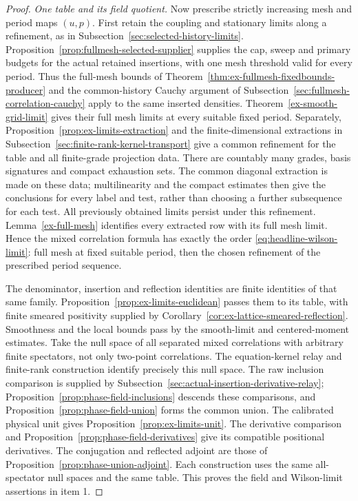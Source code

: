 \begin{proof}
\emph{One table and its field quotient.}
Now prescribe strictly increasing mesh and period maps $(u,p)$.
First retain the coupling and stationary limits along a refinement,
as in Subsection~\ref{sec:selected-history-limits}. Proposition~\ref{prop:fullmesh-selected-supplier} supplies the cap,
sweep and primary budgets for the actual retained insertions, with one
mesh threshold valid for every period. Thus the full-mesh bounds of
Theorem~\ref{thm:ex-fullmesh-fixedbounds-producer} and the common-history
Cauchy argument of Subsection~\ref{sec:fullmesh-correlation-cauchy}
apply to the same inserted densities. Theorem~\ref{ex-smooth-grid-limit}
gives their full mesh limits at every suitable fixed period. Separately,
Proposition~\ref{prop:ex-limits-extraction} and the finite-dimensional
extractions in Subsection~\ref{sec:finite-rank-kernel-transport} give a
common refinement for the table and all finite-grade projection data.
There are countably many grades, basis signatures and compact exhaustion
sets. The common diagonal extraction is made on these data; multilinearity
and the compact estimates then give the conclusions for every label and
test, rather than choosing a further subsequence for each test.
All previously obtained limits persist under this refinement.
Lemma~\ref{ex-full-mesh} identifies every extracted row with its full
mesh limit. Hence the mixed correlation formula has exactly the order
\eqref{eq:headline-wilson-limit}: full mesh at fixed suitable period,
then the chosen refinement of the prescribed period sequence.

The denominator, insertion and reflection identities are finite
identities of that same family. Proposition~\ref{prop:ex-limits-euclidean}
passes them to its table, with finite smeared positivity supplied by
Corollary~\ref{cor:ex-lattice-smeared-reflection}. Smoothness and the
local bounds pass by the smooth-limit and centered-moment estimates.
Take the null space of all separated mixed correlations with arbitrary
finite spectators, not only two-point correlations. The equation-kernel
relay and finite-rank construction identify precisely this null space.
The raw inclusion comparison is supplied by
Subsection~\ref{sec:actual-insertion-derivative-relay};
Proposition~\ref{prop:phase-field-inclusions} descends these comparisons,
and Proposition~\ref{prop:phase-field-union} forms the common union.
The calibrated physical unit gives Proposition~\ref{prop:ex-limits-unit}.
The derivative comparison and
Proposition~\ref{prop:phase-field-derivatives} give its compatible
positional derivatives. The conjugation and reflected adjoint are those
of Proposition~\ref{prop:phase-union-adjoint}. Each construction uses
the same all-spectator null spaces and the same table. This proves the
field and Wilson-limit assertions in item 1.


\end{proof}
